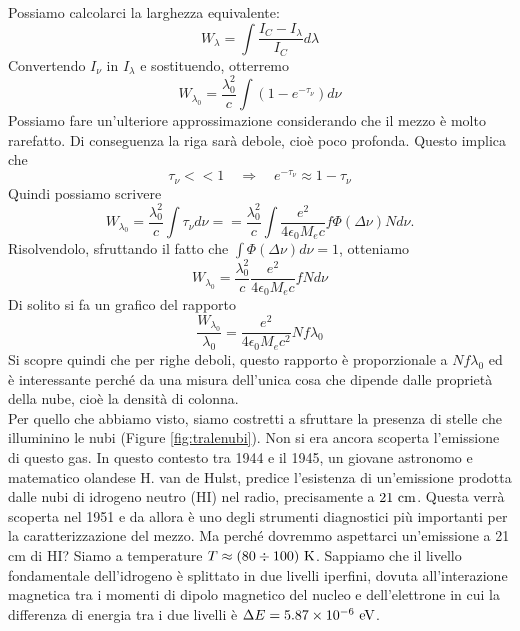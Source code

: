 Possiamo calcolarci la larghezza equivalente:
\[
    W_\lambda = \int\frac{I_C-I_\lambda}{I_C}d\lambda
\]
Convertendo $I_\nu$ in $I_\lambda$ e sostituendo, otterremo
\[
    W_{\lambda_0}=\frac{\lambda_0^2}{c}\int(1-e^{-\tau_\nu})d\nu
\]
Possiamo fare un'ulteriore approssimazione considerando che il mezzo è molto rarefatto. Di conseguenza la riga sarà debole, cioè poco profonda. Questo implica che
\[
    \tau_\nu<<1\quad \Rightarrow\quad e^{-\tau_\nu}\approx1-\tau_\nu
\]
Quindi possiamo scrivere
\[
    W_{\lambda_0}=\frac{\lambda_0^2}{c}\int\tau_\nu d\nu = =\frac{\lambda_0^2}{c}\int \frac{e^2}{4\epsilon_0 M_e c}f\Phi(\Delta \nu) N d\nu.
\]
Risolvendolo, sfruttando il fatto che $ \int \Phi(\Delta \nu)d\nu = 1$, otteniamo
\[
    W_{\lambda_0}=\frac{\lambda_0^2}{c} \frac{e^2}{4\epsilon_0 M_e c}f N d\nu
\]
Di solito si fa un grafico del rapporto 
\[
    \frac{W_{\lambda_0}}{\lambda_0}=\frac{e^2}{4\epsilon_0 M_e c^2} N f \lambda_0
\]
Si scopre quindi che per righe deboli, questo rapporto è proporzionale a $N f \lambda_0$ ed è interessante perché da una misura dell'unica cosa che dipende dalle proprietà della nube, cioè la densità di colonna.\\
Per quello che abbiamo visto, siamo costretti a sfruttare la presenza di stelle che illuminino le nubi (Figure \ref{fig:tralenubi}). Non si era ancora scoperta l'emissione di questo gas. In questo contesto tra 1944 e il 1945, un giovane astronomo e matematico olandese H. van de Hulst, predice l'esistenza di un'emissione prodotta dalle nubi di idrogeno neutro (HI) nel radio, precisamente a $21\text{ cm}$. Questa verrà scoperta nel 1951 e da allora è uno degli strumenti diagnostici più importanti per la caratterizzazione del mezzo. Ma perché dovremmo aspettarci un'emissione a 21 cm di HI? Siamo a temperature $T\approx (80\div 100)\text{ K}$. Sappiamo che il livello fondamentale dell'idrogeno è splittato in due livelli iperfini, dovuta all'interazione magnetica tra i momenti di dipolo magnetico del nucleo e dell'elettrone in cui la differenza di energia tra i due livelli è $\Delta E = 5.87\times 10^{-6} \text{ eV}$.

